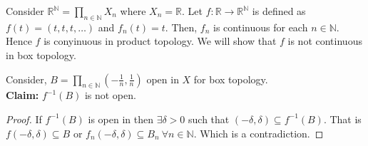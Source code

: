 \documentclass[a4paper,english,12pt]{article}   	%
\begin{document}
\begin{exmp}
Consider $\mathbb{R}^{\mathbb{N}} = \prod_{n \in \mathbb{N}} X_{n}$ where $X_{n} = \mathbb{R}$. Let $f \colon \mathbb{R} \to \mathbb{R}^{\mathbb{N}}$ is defined as $f(t) = (t,t,t,\ldots)$ and $f_{n}(t) = t$. Then, $f_{n}$ is continuous for each $n \in \mathbb{N}$. Hence $f$ is conyinuous in product topology. We will show that $f$ is not continuous in box topology. \par
Consider, $B = \prod_{n \in \mathbb{N}} (-\frac{1}{n} , \frac{1}{n})$ open in $X$ for box topology.\\
\textbf{Claim:} $f^{-1}(B)$ is not open.
\begin{proof}
If $f^{-1}(B)$ is open in then $\exists \delta > 0$ such that $(-\delta,\delta) \subseteq f^{-1}(B)$. That is $f(-\delta,\delta) \subseteq B$ or $f_{n}(-\delta,\delta) \subseteq B_{n} ~\forall n \in \mathbb{N}$. Which is a contradiction.   
\end{proof}
\end{exmp}
\end{document}
